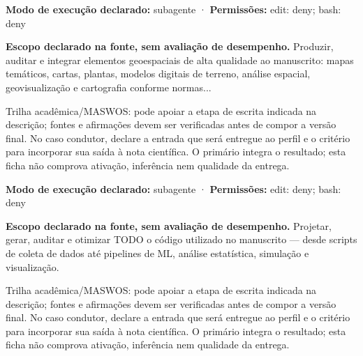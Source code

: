 \begin{arquitetura}
\textbf{Modo de execução declarado:} subagente · \textbf{Permissões:} edit: deny; bash: deny
\end{arquitetura}


\begin{descricao}
\textbf{Escopo declarado na fonte, sem avaliação de desempenho.}
Produzir, auditar e integrar elementos geoespaciais de alta qualidade ao manuscrito: mapas temáticos, cartas, plantas, modelos digitais de terreno, análise espacial, geovisualização e cartografia conforme normas...
\end{descricao}

\begin{funcao}
Trilha acadêmica/MASWOS: pode apoiar a etapa de escrita indicada na descrição; fontes e afirmações devem ser verificadas antes de compor a versão final. No caso condutor, declare a entrada que será entregue ao perfil e o critério para incorporar sua saída à nota científica. O primário integra o resultado; esta ficha não comprova ativação, inferência nem qualidade da entrega.
\end{funcao}

\begin{arquitetura}
\textbf{Modo de execução declarado:} subagente · \textbf{Permissões:} edit: deny; bash: deny
\end{arquitetura}


\begin{descricao}
\textbf{Escopo declarado na fonte, sem avaliação de desempenho.}
Projetar, gerar, auditar e otimizar TODO o código utilizado no manuscrito — desde scripts de coleta de dados até pipelines de ML, análise estatística, simulação e visualização.
\end{descricao}

\begin{funcao}
Trilha acadêmica/MASWOS: pode apoiar a etapa de escrita indicada na descrição; fontes e afirmações devem ser verificadas antes de compor a versão final. No caso condutor, declare a entrada que será entregue ao perfil e o critério para incorporar sua saída à nota científica. O primário integra o resultado; esta ficha não comprova ativação, inferência nem qualidade da entrega.
\end{funcao}


